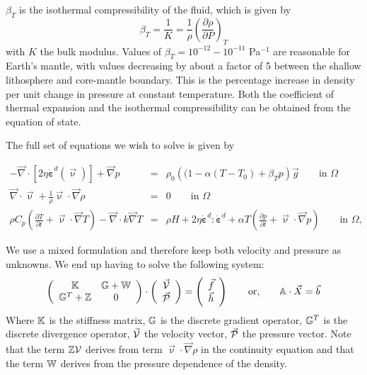 \documentclass[a4paper,12pt]{article}
\begin{document}
$\beta_T$ is the isothermal compressibility of the fluid, which is given by 
\[
\beta_T = \frac{1}{K} = \frac{1}{\rho}\left( \frac{\partial \rho}{\partial P} \right)_T
\]
with $K$ the bulk modulus. 
Values of $\beta_T=10^{-12}-10^{-11}$ Pa$^{-1}$ are reasonable for Earth's mantle, with values decreasing by about a
factor of 5 between the shallow lithosphere and core-mantle boundary.
This is the percentage increase in density per unit change in pressure at constant temperature.
Both the coefficient of thermal expansion and the isothermal compressibility can be obtained
from the equation of state.

The full set of equations we wish to solve is given by

\begin{eqnarray}
-\vec\nabla \cdot \left[2\eta \dot{\bm \varepsilon}^d({\vec\upnu}) \right] + \vec \nabla p &=& \rho_0 \left((1 - \alpha(T-T_0) + \beta_T p \right) {\vec g} \quad\quad \textrm{in $\Omega$}  \label{eq:stokes-1a_} \\
\vec\nabla \cdot {\vec\upnu} + \frac{1}{\rho} {\vec\upnu} \cdot {\vec \nabla}\rho&=&0 \quad\quad  \textrm{in $\Omega$}   \label{eq:stokes-2a_} \\
\rho C_p \left(\frac{\partial T}{\partial t} + \vec{\upnu}\cdot \vec\nabla T\right) - \vec\nabla\cdot k\vec\nabla T   &=& 
  \rho H  +  2\eta \dot{\bm \varepsilon}^d : \dot{\bm \varepsilon}^d    +\alpha T \left( \frac{\partial p}{\partial t}+  \vec{\upnu} \cdot \vec\nabla p \right) 
\quad\quad   \textrm{in $\Omega$},
  \label{eq:temperature_}
\end{eqnarray}


We use a mixed formulation and therefore  
keep both velocity and pressure as unknowns. We end up having to solve 
the following system:
\[
\left(
\begin{array}{cc}
{\mathbb{K}} & {\mathbb{G}}+{\mathbb{W}} \\ {\mathbb{G}}^T+{\mathbb{Z}} & 0 
\end{array}
\right)
\cdot
\left(
\begin{array}{c}
\vec{\cal V} \\ \vec{\cal P}
\end{array}
\right)
=
\left(
\begin{array}{c}
\vec{f} \\ \vec{h}
\end{array}
\right)
\quad\quad
{\rm or,}
\quad\quad
{\mathbb{A}} \cdot \vec{X} = \vec{b}
\]
Where ${\mathbb{K}}$ is the stiffness matrix, ${\mathbb{G}}$ is the discrete gradient operator, 
${\mathbb{G}}^T$ is the discrete divergence operator, $\vec{\cal V}$ the velocity vector, 
$\vec{\cal P}$ the pressure vector.
Note that the term ${\mathbb{Z}}{\cal V}$ derives from term ${\vec\upnu} \cdot {\vec \nabla} \rho$ in the continuity equation
and that the term ${\mathbb{W}}$ derives from the pressure dependence of the density.
\end{document}
